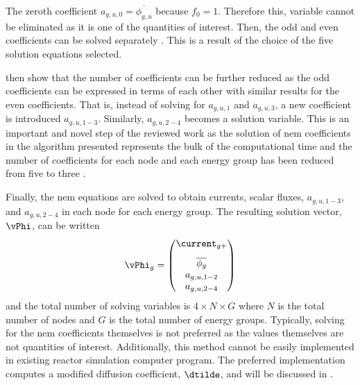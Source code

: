       The zeroth coefficient $a_{g,u,0} = \overline{\phi_{g,u}}$ because $f_0 =
      1$. Therefore this, variable cannot be eliminated as it is one of the
      quantities of interest. Then, the odd and even coefficients can be solved
      separately \cite{gehinThesis}. This is a result of the choice of the five
      solution equations selected. 

      \citeauthor{qe2paper} then show that the number of coefficients can be
      further reduced as the odd coefficients can be expressed in terms of
      each other with similar results for the even coefficients. That is,
      instead of solving for $a_{g,u,1}$ and $a_{g,u,3}$, a new coefficient is
      introduced $a_{g,u,1-3}$. Similarly, $a_{g,u,2-4}$ becomes a solution
      variable. This is an important and novel step of the reviewed work as the
      solution of \gls{nem} coefficients in the algorithm presented represents 
      the bulk of the computational time and the number of coefficients for each
      node and each energy group has been reduced from five to three
      \cite{qe2paper}.

      Finally, the \gls{nem} equations are solved to obtain currents, scalar
      fluxes, $a_{g,u,1-3}$, and $a_{g,u,2-4}$ in each node for each energy
      group. The resulting solution vector, $\vPhi$, can be written 
      \begin{equation}
        \label{eq:solution_vector}
        \vPhi_g =
        \begin{pmatrix}
          \vspace{8pt}
          \current_{g+} \\
          \overline{\phi_g} \\
          a_{g,u,1-2} \\
          a_{g,u,2-4}
        \end{pmatrix}
      \end{equation}
      and the total number of solving variables is $4 \times N \times G$ where
      $N$ is the total number of nodes and $G$ is the total number of energy
      groups. Typically, solving for the \gls{nem} coefficients themselves is
      not preferred as the values themselves are not quantities of interest.
      Additionally, this method cannot be easily implemented in existing reactor
      simulation computer program. The preferred implementation computes a
      modified diffusion coefficient, $\dtilde$, and will be discussed in
      .

